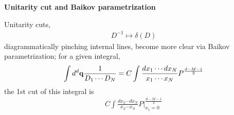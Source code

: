 \documentclass[10pt]{article}
\begin{document}
\textbf{Unitarity cut and Baikov parametrization}

Unitarity cuts, 
\begin{eqnarray}
\nonumber
D^{-1} \mapsto \delta(D)
\end{eqnarray}
diagrammatically pinching internal lines, become more clear via Baikov parametrization; for a given integral,
\begin{eqnarray}
\nonumber
\int d^d \bold{q} \frac{1}{D_1 \cdots D_N}
=
C \int \frac{dx_1 \cdots dx_N}{x_1 \cdots x_N} P^{\frac{d-M-1}{2}}
\end{eqnarray}
the 1st cut of this integral is
\begin{eqnarray}
\nonumber
C \int \frac{dx_2 \cdots dx_N}{x_2 \cdots x_N} \left.P\right|_{x_1 = 0}^{\frac{d-M-1}{2}}
\end{eqnarray}
\end{document}
